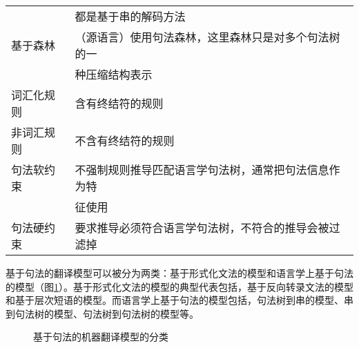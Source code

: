 \begin{table}[htp]
{\begin{center}
{\begin{tabular}{p{6.5em} | l}
&都是基于串的解码方法 \\
\rule{0pt}{15pt}基于森林 &（源语言）使用句法森林，这里森林只是对多个句法树的一 \\
                         & 种压缩结构表示 \\
\rule{0pt}{15pt}词汇化规则 & 含有终结符的规则 \\
\rule{0pt}{15pt}非词汇规则 & 不含有终结符的规则 \\
\rule{0pt}{15pt}句法软约束 & 不强制规则推导匹配语言学句法树，通常把句法信息作为特\\
&征使用 \\
\rule{0pt}{15pt}句法硬约束 & 要求推导必须符合语言学句法树，不符合的推导会被过滤掉
\end{tabular}
}
\end{center}
}\end{table}

\parinterval 基于句法的翻译模型可以被分为两类：基于形式化文法的模型和语言学上基于句法的模型（图\ref{fig:8-17}）。基于形式化文法的模型的典型代表包括，基于反向转录文法的模型和基于层次短语的模型。而语言学上基于句法的模型包括，句法树到串的模型、串到句法树的模型、句法树到句法树的模型等。

\begin{figure}[htp]
\centering

\caption{基于句法的机器翻译模型的分类}
\label{fig:8-17}
\end{figure}

